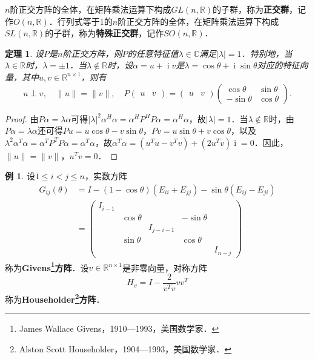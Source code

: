 \documentclass[a4paper,fontset=windows]{ctexbook}
\newtheorem{theorem}{定理}[chapter]
\theoremstyle{definition}
\newtheorem{example}{例}[chapter]
\DeclareMathOperator{\I}{i}
\renewcommand{\le}{\leqslant}
\begin{document}
$n$阶正交方阵的全体，在矩阵乘法运算下构成$GL(n,\mathbb{R})$的子群，称为{\bf 正交群}，记作$O(n,\mathbb{R})$．行列式等于1的$n$阶正交方阵的全体，在矩阵乘法运算下构成$SL(n,\mathbb{R})$的子群，称为{\bf 特殊正交群}，记作$SO(n,\mathbb{R})$．

\begin{theorem}\label{thm6.2}
设$P$是$n$阶正交方阵，则$P$的任意特征值$\lambda\in\mathbb{C}$满足$|\lambda|=1$．特别地，当$\lambda\in\mathbb{R}$时，$\lambda=\pm 1$．当$\lambda\notin\mathbb{R}$时，设$\alpha=u+\I v$是$\lambda=\cos\theta+\I\sin\theta$对应的特征向量，其中$u,v\in\mathbb{R}^{n\times 1}$，则有
$$u\perp v,\quad\|u\|=\|v\|,\quad P\begin{pmatrix}u&v\end{pmatrix}=\begin{pmatrix}u&v\end{pmatrix}\begin{pmatrix}\cos\theta&\sin\theta \\ -\sin\theta&\cos\theta\end{pmatrix}.$$
\end{theorem}

\begin{proof}
由$P\alpha=\lambda\alpha$可得$|\lambda|^2\alpha^H\alpha=\alpha^HP^HP\alpha=\alpha^H\alpha$，故$|\lambda|=1$．当$\lambda\notin\mathbb{R}$时，由$P\alpha=\lambda\alpha$还可得$Pu=u\cos\theta-v\sin\theta$，$Pv=u\sin\theta+v\cos\theta$，以及$\lambda^2\alpha^T\alpha=\alpha^TP^TP\alpha=\alpha^T\alpha$，故$\alpha^T\alpha=(u^Tu-v^Tv)+(2u^Tv)\I=0$．因此，$\|u\|=\|v\|$，$u^Tv=0$．
\end{proof}

\begin{example}
设$1\le i<j\le n$，实数方阵
\begin{align*}
G_{ij}(\theta)&=I-(1-\cos\theta)(E_{ii}+E_{jj})-\sin\theta(E_{ij}-E_{ji}) \\
&=\begin{pmatrix}I_{i-1}&&&& \\ &\cos\theta&&-\sin\theta& \\ &&I_{j-i-1}&& \\ &\sin\theta&&\cos\theta& \\ &&&&I_{n-j}\end{pmatrix}
\end{align*}
称为{\bf Givens\footnote{James Wallace Givens，1910—1993，美国数学家．}方阵}．设$v\in\mathbb{R}^{n\times 1}$是非零向量，对称方阵
$$H_v=I-\frac{2}{v^Tv}vv^T$$
称为{\bf Householder\footnote{Alston Scott Householder，1904—1993，美国数学家．}方阵}．
\end{example}
\end{document}
